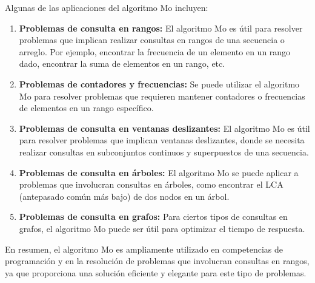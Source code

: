 Algunas de las aplicaciones del algoritmo Mo incluyen:

\begin{enumerate}
	\item \textbf{Problemas de consulta en rangos:} El algoritmo Mo es útil para resolver problemas que implican realizar consultas en rangos de una secuencia o arreglo. Por ejemplo, encontrar la frecuencia de un elemento en un rango dado, encontrar la suma de elementos en un rango, etc.
	\item \textbf{Problemas de contadores y frecuencias:} Se puede utilizar el algoritmo Mo para resolver problemas que requieren mantener contadores o frecuencias de elementos en un rango específico.
	\item \textbf{Problemas de consulta en ventanas deslizantes:} El algoritmo Mo es útil para resolver problemas que implican ventanas deslizantes, donde se necesita realizar consultas en subconjuntos continuos y superpuestos de una secuencia.
	\item \textbf{Problemas de consulta en árboles:}  El algoritmo Mo se puede aplicar a problemas que involucran consultas en árboles, como encontrar el LCA (antepasado común más bajo) de dos nodos en un árbol.
	\item \textbf{Problemas de consulta en grafos:} Para ciertos tipos de consultas en grafos, el algoritmo Mo puede ser útil para optimizar el tiempo de respuesta.
	
\end{enumerate}

En resumen, el algoritmo Mo es ampliamente utilizado en competencias de programación y en la resolución de problemas que involucran consultas en rangos, ya que proporciona una solución eficiente y elegante para este tipo de problemas.